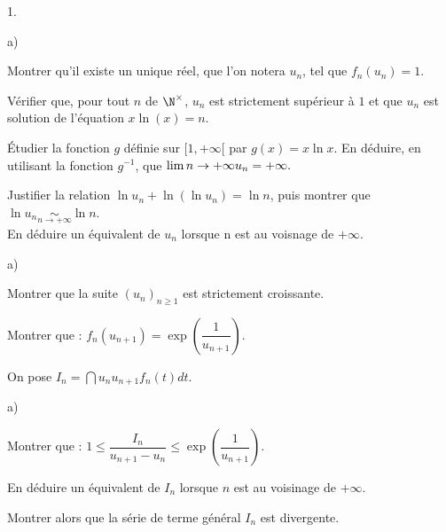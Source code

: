 \documentclass[11pt]{article}%
\begin{document}
\begin{noliste}{1.}
\begin{noliste}{a)}
 \setlength{\itemsep}{2mm}
\item Montrer qu'il existe un unique réel, que l'on notera $u_{n}$, tel
que $
f_{n}(u_{n}) = 1$.

\item Vérifier que, pour tout $n$ de $\N^{\times }$, $u_{n}$ est
strictement supérieur à $1$ et que $u_{n}$ est solution de l'équation
$x\ln
(x) = n$.

\item Étudier la fonction $g$ définie sur $[1, + \infty \lbrack $ par $
g(x) = x\ln x$. En déduire, en utilisant la fonction $g^{-1}$, que $
\lim{n\rightarrow + \infty }u_{n} = + \infty.$

\item Justifier la relation $\ln u_{n} + \ln (\ln u_{n}) = \ln n$, puis
montrer
que $\ln u_{n}\underset{n\rightarrow + \infty }{\sim }\ln n$. \\
En déduire un équivalent de $u_{n}$ lorsque n est au voisnage de $ +
\infty $.
\end{noliste}

\item 

\begin{noliste}{a)}
 \setlength{\itemsep}{2mm}
\item Montrer que la suite $(u_{n})_{n\geq 1}$ est strictement
croissante.

\item Montrer que : $f_{n}(u_{n + 1}) = \exp (\dfrac{1}{u_{n + 1}})$.
\end{noliste}

\item On pose $I_{n} = \dint{u_{n}}{u_{n + 1}}f_{n}(t)dt$.

\begin{noliste}{a)}
 \setlength{\itemsep}{2mm}
\item Montrer que : $1\leq \dfrac{I_{n}}{u_{n + 1}-u_{n}}\leq \exp (
\dfrac{1}{u_{n + 1}})$.

\item En déduire un équivalent de $I_{n}$ lorsque $n$ est au voisinage
de $
 + \infty $.

\item Montrer alors que la série de terme général $I_{n}$ est
divergente.
\end{noliste}
\end{noliste}

\label{fin}
\end{document}

